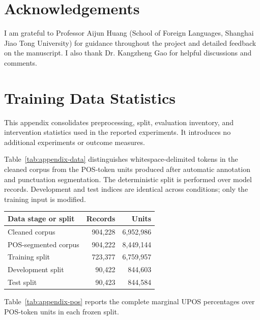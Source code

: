 \documentclass[11pt]{article}
\begin{document}
\section*{Acknowledgements}

I am grateful to Professor Aijun Huang (School of Foreign Languages, Shanghai Jiao Tong University) for guidance throughout the project and detailed feedback on the manuscript. I also thank Dr. Kangzheng Gao for helpful discussions and comments.



\appendix
\section{Training Data Statistics}

This appendix consolidates preprocessing, split, evaluation inventory, and intervention statistics used in the reported experiments. It introduces no additional experiments or outcome measures.

Table~\ref{tab:appendix-data} distinguishes whitespace-delimited tokens in the cleaned corpus from the POS-token units produced after automatic annotation and punctuation segmentation. The deterministic split is performed over model records. Development and test indices are identical across conditions; only the training input is modified.

\begin{center}
  \small
  \setlength{\tabcolsep}{4pt}
  \begin{tabular}{@{}lrr@{}}
    \toprule
    Data stage or split & Records & Units \\
    \midrule
    Cleaned corpus & 904,228 & 6,952,986 \\
    POS-segmented corpus & 904,222 & 8,449,144 \\
    Training split & 723,377 & 6,759,957 \\
    Development split & 90,422 & 844,603 \\
    Test split & 90,423 & 844,584 \\
    \bottomrule
  \end{tabular}
  \label{tab:appendix-data}
\end{center}

Table~\ref{tab:appendix-pos} reports the complete marginal UPOS percentages over POS-token units in each frozen split.
\end{document}
